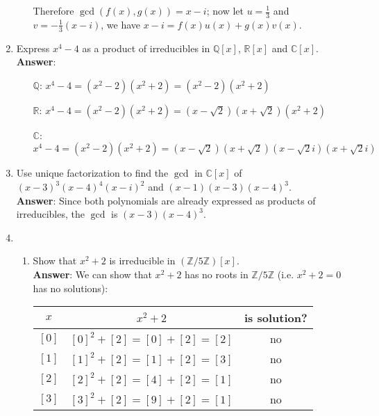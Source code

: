 \documentclass{article}
\begin{document}
\begin{enumerate}
\begin{enumerate}[start=2]
                        Therefore $\gcd(f(x),g(x))=x-i$; now let $u=\frac{1}{3}$ and $v=-\frac{1}{3}(x-i)$, we have $x-i=f(x)u(x)+g(x)v(x)$.
            \end{enumerate}
      \item Express $x^4-4$ as a product of irreducibles in $\mathbb{Q}[x]$, $\mathbb{R}[x]$ and $\mathbb{C}[x]$.\\
            \textbf{Answer}:
            \begin{itemize}
                  \item [$\mathbb{Q}$:] $x^4-4=(x^2-2)(x^2+2)=(x^2-2)(x^2+2)$
                  \item [$\mathbb{R}$:] $x^4-4=(x^2-2)(x^2+2)=(x-\sqrt{2})(x+\sqrt{2})(x^2+2)$
                  \item [$\mathbb{C}$:] $x^4-4=(x^2-2)(x^2+2)=(x-\sqrt{2})(x+\sqrt{2})(x-\sqrt{2}i)(x+\sqrt{2}i)$
            \end{itemize}
      \item Use unique factorization to find the $\gcd$ in $\mathbb{C}[x]$ of $(x-3)^3(x-4)^4(x-i)^2$ and $(x-1)(x-3)(x-4)^3$.\\
            \textbf{Answer}: Since both polynomials are already expressed as products of irreducibles, the $\gcd$ is $(x-3)(x-4)^3$.
      \item
            \begin{enumerate}
                  \item Show that $x^2+2$ is irreducible in $(\mathbb{Z}/5\mathbb{Z})[x]$.\\
                        \textbf{Answer}: We can show that $x^2+2$ has no roots in $\mathbb{Z}/5\mathbb{Z}$ (i.e. $x^2+2=0$ has no solutions):
                        \begin{center}
                              \begin{tabular}{c|c|c}
                                    $x$   & $x^2+2$                  & is solution? \\
                                    \hline
                                    $[0]$ & $[0]^2+[2]=[0]+[2]=[2]$  & no           \\
                                    $[1]$ & $[1]^2+[2]=[1]+[2]=[3]$  & no           \\
                                    $[2]$ & $[2]^2+[2]=[4]+[2]=[1]$  & no           \\
                                    $[3]$ & $[3]^2+[2]=[9]+[2]=[1]$  & no           \\

\end{tabular}
\end{center}
\end{enumerate}
\end{enumerate}
\end{document}
